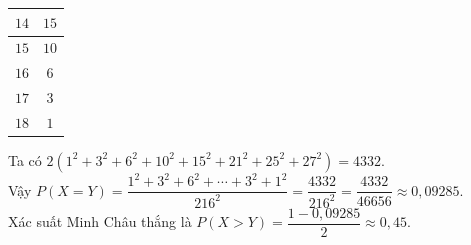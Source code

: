 \begin{ex}
{\begin{center}
\begin{tabular}{|c|c|}
				\hline
				$14$ & $15$\\
				\hline
				$15$ & $10$\\
				\hline
				$16$ & $6$\\
				\hline
				$17$ & $3$\\
				\hline
				$18$ & $1$\\
				\hline
			\end{tabular}
		\end{center}
		Ta có $2(1^2+3^2+6^2+10^2+15^2+21^2+25^2+27^2) =4332$.\\
		Vậy $P(X=Y) = \dfrac{1^2+3^2+6^2+\cdots+3^2+1^2}{216^2}=\dfrac{4332}{216^2} = \dfrac{4332}{46656} \approx 0{,}09285$.\\
		Xác suất Minh Châu thắng là $P(X > Y) = \dfrac{1 - 0{,}09285}{2} \approx 0{,}45$.
	}
\end{ex}

